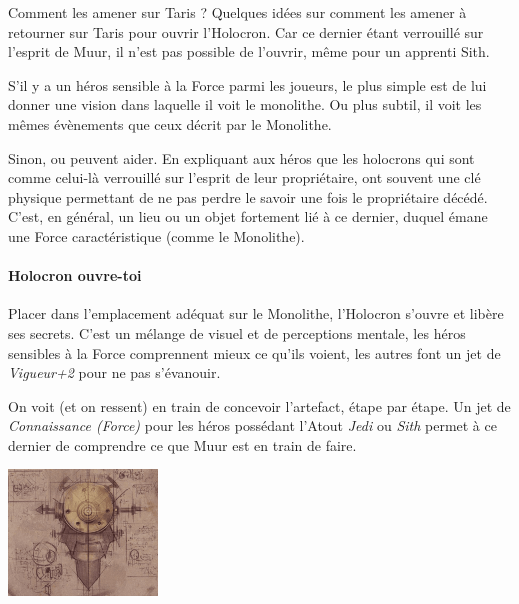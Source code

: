 \newpage
\begin{paperbox}{Comment les amener sur Taris ?}
Quelques idées sur comment les amener à retourner sur Taris pour ouvrir l’Holocron. Car ce dernier étant verrouillé sur l’esprit de Muur, il n’est pas possible de l’ouvrir, même pour un apprenti Sith.

    \begin{rebelist}
        \item S’il y a un héros sensible à la Force parmi les joueurs, le plus simple est de lui donner une vision dans laquelle il voit le monolithe. Ou plus subtil, il voit les mêmes évènements que ceux décrit par le Monolithe.
        \item Sinon,  ou  peuvent aider. En expliquant aux héros que les holocrons qui sont comme celui-là verrouillé sur l’esprit de leur propriétaire, ont souvent une clé physique permettant de ne pas perdre le savoir une fois le propriétaire décédé. C’est, en général, un lieu ou un objet fortement lié à ce dernier, duquel émane une Force caractéristique (comme le Monolithe).
    \end{rebelist}
\end{paperbox}

\paragraph{Holocron ouvre-toi}
Placer dans l’emplacement adéquat sur le Monolithe, l’Holocron s’ouvre et libère ses secrets. C’est un mélange de visuel et de perceptions mentale, les héros sensibles à la Force comprennent mieux ce qu’ils voient, les autres font un jet de \textit{Vigueur+2} pour ne pas s’évanouir.

On voit (et on ressent)  en train de concevoir l’artefact, étape par étape. Un jet de \textit{Connaissance (Force)} pour les héros possédant l’Atout \textit{Jedi} ou \textit{Sith} permet à ce dernier de comprendre ce que Muur est en train de faire.

\noindent\includegraphics[width=\linewidth]{_img/talisman-book.png}

